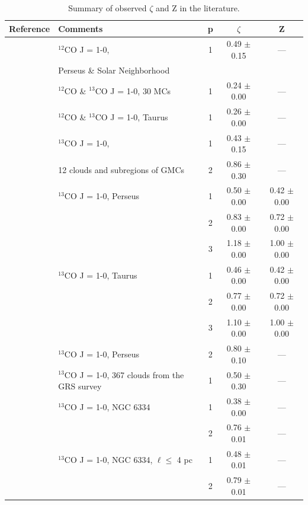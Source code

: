 \documentclass{aa}		%
\begin{document}
\begin{table} 
\centering 
	\begin{tabular}{llccc} 
	\centering 
		Reference 	& Comments & p & $\zeta$ & Z \\ \hline  \hline
        \citet{Heyer2007}	& $^{12}$CO J = 1-0, & 1 &  0.49 $\pm$  0.15 &  --- \\ 
                            & Perseus \& Solar Neighborhood & & & \\ \hline
        \citet{Heyer2015} 	& $^{12}$CO \& $^{13}$CO J = 1-0, 30  MCs & 1 &  0.24 $\pm$ 0.00 & --- \\ 
                            & $^{12}$CO \& $^{13}$CO J = 1-0, Taurus &  1 &  0.26 $\pm$  0.00 & --- \\  \hline
        \citet{Miesch1994} 	& $^{13}$CO J = 1-0, & 1 &  0.43 $\pm$  0.15 & --- \\ 
                            & 12 clouds and subregions of GMCs & 2 &  0.86 $\pm$  0.30 &  --- \\  \hline
        \citet{Padoan2003}	& $^{13}$CO J = 1-0, Perseus & 1 &  0.50 $\pm$  0.00 &  0.42 $\pm$  0.00 \\ 
                            &  & 2 &  0.83 $\pm$  0.00 &  0.72 $\pm$  0.00 \\ 
                            &		 & 3 &  1.18 $\pm$  0.00 &  1.00 $\pm$  0.00 \\ 
                            & $^{13}$CO J = 1-0, Taurus & 1 &  0.46 $\pm$  0.00 &  0.42 $\pm$  0.00 \\ 
                            &		 & 2 &  0.77 $\pm$  0.00 &  0.72 $\pm$  0.00 \\ 
                            &		 & 3 &  1.10 $\pm$  0.00 &  1.00 $\pm$  0.00 \\  \hline
        \citet{Padoan2006} 	& $^{13}$CO J = 1-0, Perseus & 2 &   0.80 $\pm$  0.10    &  --- \\  \hline
        \citet{RomanDuval2011} & $^{13}$CO J = 1-0, 367 clouds  from the GRS survey & 1 & 0.50  $\pm$   0.30  &   --- \\  \hline
        \citet{Zernickel2015} & $^{13}$CO J = 1-0, NGC 6334 & 1 &  0.38 $\pm$  0.00  &   --- \\ 
                            &		 & 2 &  0.76  $\pm$    0.01 &  --- \\ 
                            & $^{13}$CO J = 1-0, NGC 6334, $\ell \leq$ 4 pc  & 1 &  0.48 $\pm$  0.01 &  --- \\
                            & & 2 &  0.79 $\pm$  0.01 &  --- 
	\end{tabular} 
	\caption{Summary of observed $\zeta$ and Z in the literature.} 
	\label{tab:discussion:summary_obs} 
\end{table} 
\end{document}
